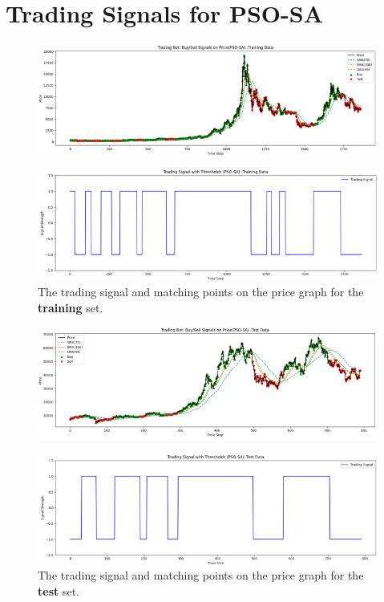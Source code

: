 \documentclass[a4paper, 12pt]{extarticle}
\begin{document}
\newpage
\section{Trading Signals for PSO-SA}
\begin{figure}[h!]
    \centering
    \includegraphics[width=\textwidth]{./assets/psosa_train.png}
\end{figure}
\begin{figure}[h!]
    \centering
    \includegraphics[width=\textwidth]{./assets/psosa_train_signal.png}
    \caption{The trading signal and matching points on the price graph for the \textbf{training} set.}
\end{figure}
\newpage
\begin{figure}[h!]
    \centering
    \includegraphics[width=\textwidth]{./assets/psosa_test.png}
\end{figure}
\begin{figure}[h!]
    \centering
    \includegraphics[width=\textwidth]{./assets/psosa_test_signal.png}
    \caption{The trading signal and matching points on the price graph for the \textbf{test} set.}
\end{figure}
\end{document}
